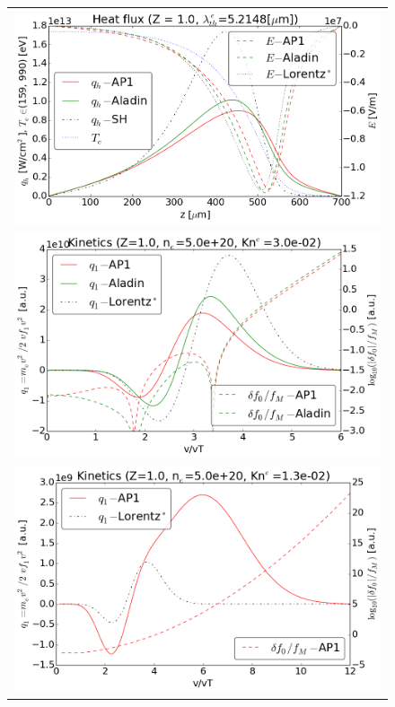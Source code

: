 \begin{figure}[tbh]
  \begin{center}
    \begin{tabular}{c}
      \includegraphics[width=\figscale\textwidth]{../VFPdata/C7_Aladin_case5_heatflux.png} \\
      \includegraphics[width=\figscale\textwidth]{../VFPdata/C7_Aladin_case5_kinetics.png} \\
	  \includegraphics[width=\figscale\textwidth]{../VFPdata/C7_Aladin_case5_nonlocal_kinetics.png}

\end{tabular}
\end{center}
\end{figure}
